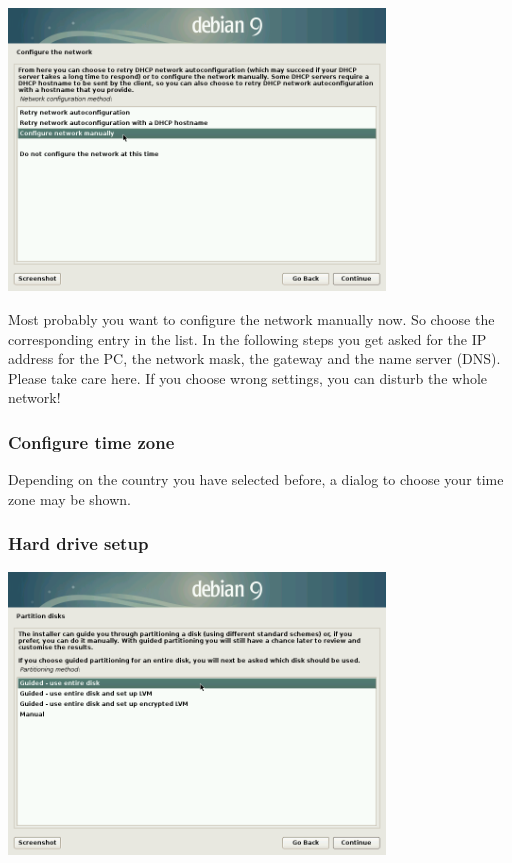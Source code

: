 \documentclass[a4paper,12pt,twoside]{article}
\begin{document}
\bigskip
\begin{minipage}{\linewidth}
    \centering
    \captionsetup{type=figure}
    \includegraphics[width=10cm]{screenshots/select_network_manually.png}
    \label{fig:network_manual}
\end{minipage}
\bigskip

Most probably you want to configure the network manually now. So choose
the corresponding entry in the list. In the following steps you get
asked for the IP address for the PC, the network mask, the gateway and
the name server (DNS). Please take care here. If you choose wrong
settings, you can disturb the whole network!


\subsubsection{Configure time zone}
\label{sct:inst_timezone}

Depending on the country you have selected before, a dialog to choose
your time zone may be shown.


\subsubsection{Hard drive setup}
\label{sct:inst_harddrive}

\begin{minipage}{\linewidth}
    \centering
    \captionsetup{type=figure}
    \includegraphics[width=10cm]{screenshots/select_partitioning.png}
    \label{fig:partitioning}
\end{minipage}
\bigskip
\end{document}
